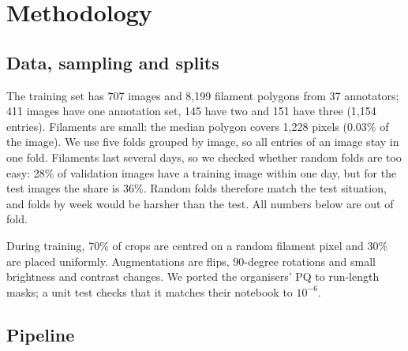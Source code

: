 \documentclass[sigconf]{acmart}
\begin{document}
\section{Methodology}\label{sec:methodology}

\subsection{Data, sampling and splits}

The training set has 707 images and 8,199 filament polygons from 37 annotators; 411 images
have one annotation set, 145 have two and 151 have three (1,154 entries). Filaments are small:
the median polygon covers 1,228 pixels (0.03\% of the image). We use five folds grouped by
image, so all entries of an image stay in one fold. Filaments last several days, so we checked
whether random folds are too easy: 28\% of validation images have a training image within one
day, but for the test images the share is 36\%. Random folds therefore match the test
situation, and folds by week would be harsher than the test. All numbers below are out of fold.

During training, 70\% of crops are centred on a random filament pixel and 30\% are placed
uniformly. Augmentations are flips, 90-degree rotations and small brightness and contrast
changes. We ported the organisers' PQ to run-length masks; a unit test checks that it matches
their notebook to $10^{-6}$.

\subsection{Pipeline}
\end{document}
